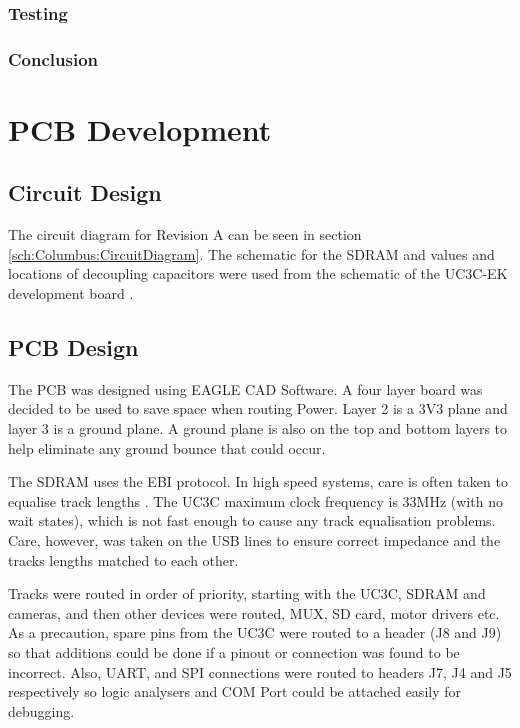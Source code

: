 \subsubsection{Testing}\label{Section:MotorTest}
\subsubsection{Conclusion}

\section{PCB Development}\label{Section:PCB_Dev}
\subsection{Circuit Design}
The circuit diagram for Revision A can be seen in section \ref{sch:Columbus:CircuitDiagram}. The schematic for the SDRAM and values and locations of decoupling capacitors were used from the schematic of the UC3C-EK development board \citep{Atmel:UC3CEK}. 
\subsection{PCB Design}
The PCB was designed using EAGLE CAD Software. A four layer board was decided to be used to save space when routing Power. Layer 2 is a 3V3 plane and layer 3 is a ground plane. A ground plane is also on the top and bottom layers to help eliminate any ground bounce that could occur. 

The SDRAM uses the EBI protocol. In high speed systems, care is often taken to equalise track lengths \citep{liu2004equalization}. The UC3C maximum clock frequency is 33MHz (with no wait states), which is not fast enough to cause any track equalisation problems. Care, however, was taken on the USB lines to ensure correct impedance and the tracks lengths matched to each other.

Tracks were routed in order of priority, starting with the UC3C, SDRAM and cameras, and then other devices were routed, \itc MUX, SD card, motor drivers etc. As a precaution, spare pins from the UC3C were routed to a header (J8 and J9) so that additions could be done if a pinout or connection was found to be incorrect. Also, UART, \itc and SPI connections were routed to headers J7, J4 and J5 respectively so logic analysers and COM Port could be attached easily for debugging.

